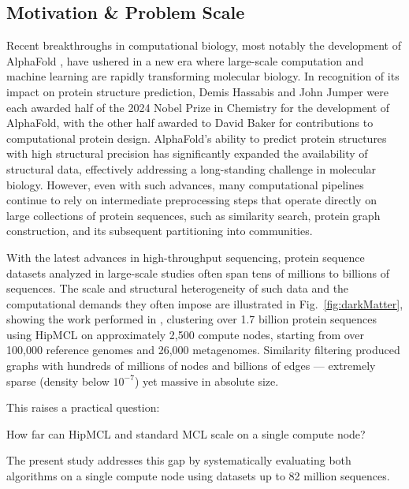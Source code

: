 \subsection*{Motivation \& Problem Scale}

Recent breakthroughs in computational biology, most notably the development of
AlphaFold \cite{alphafold}, have ushered in a new era where large-scale
computation and machine learning are rapidly transforming molecular biology.
In recognition of its impact on protein structure prediction, Demis Hassabis
and John Jumper were each awarded half of the 2024 Nobel Prize in Chemistry for
the development of AlphaFold, with the other half awarded to David Baker for
contributions to computational protein design. AlphaFold's ability to predict
protein structures with high structural precision has significantly expanded the
availability of structural data, effectively addressing a long-standing
challenge in molecular biology. However, even with such advances, many
computational pipelines continue to rely on intermediate preprocessing steps
that operate directly on large collections of protein sequences, such as
similarity search, protein graph construction, and its subsequent partitioning
into communities.

With the latest advances in high-throughput sequencing, protein sequence
datasets analyzed in large-scale studies often span tens of millions to
billions of sequences. The scale and structural heterogeneity of such data 
and the computational demands they often impose are illustrated in
Fig.~\ref{fig:darkMatter}, showing the work performed in \cite{darkMatter},
clustering over 1.7 billion protein sequences using HipMCL on approximately
2,500 compute nodes, starting from over 100,000 reference genomes and 26,000
metagenomes. Similarity filtering produced graphs with hundreds of millions of
nodes and billions of edges --- extremely sparse (density below \(10^{-7}\))
yet massive in absolute size. 

This raises a practical question:
\begin{center}
  How far can HipMCL and standard MCL scale on a single compute node?
\end{center}
The present study addresses this gap by systematically
evaluating both algorithms on a single compute node using datasets up to 82
million sequences.

